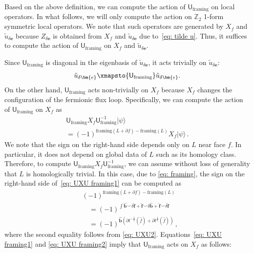 \documentclass[aps,twocolumn,prx,floatfix,preprintnumbers, nofootinbib,10pt]{revtex4-2}
\numberwithin{equation}{section}
\theoremstyle{definition}
\theoremstyle{remark}
\theoremstyle{claim}
\def\ket#1{{|{#1}\rangle}}
\renewcommand{\sf}[1]{\mathsf{#1}}
\begin{document}
Based on the above definition, we can compute the action of $\sf{U}_{\text{framing}}$ on local operators.
In what follows, we will only compute the action on $\mathbb{Z}_2$ 1-form symmetric local operators.
We note that such operators are generated by $X_f$ and $\tilde{u}_{\delta \bm{e}}$ because $Z_{\delta \bm{e}}$ is obtained from $X_f$ and $\tilde{u}_{\delta \bm{e}}$ due to~\eqref{eq: tilde u}.
Thus, it suffices to compute the action of $\sf{U}_{\text{framing}}$ on $X_f$ and $\tilde{u}_{\delta \bm{e}}$.

Since $\sf{U}_{\text{framing}}$ is diagonal in the eigenbasis of $\tilde{u}_{\delta \bm{e}}$, it acts trivially on $\tilde{u}_{\delta \bm{e}}$:
\begin{equation}
\tilde{u}_{\delta \bm{e}} \xmapsto{\sf{U}_{\text{framing}}} \tilde{u}_{\delta \bm{e}}.
\label{eq: U framing u}
\end{equation}
On the other hand, $\sf{U}_{\text{framing}}$ acts non-trivially on $X_f$ because $X_f$ changes the configuration of the fermionic flux loop.
Specifically, we can compute the action of $\sf{U}_{\text{framing}}$ on $X_f$ as
\begin{multline}\label{eq: UXU framing1}
 \sf{U}_{\text{framing}} X_f \sf{U}_{\text{framing}}^{-1} \ket{\psi} \\
= (-1)^{\mathrm{framing}(L+\partial f) - \mathrm{framing}(L)} X_f \ket{\psi} \,.
\end{multline}
We note that the sign on the right-hand side depends only on $L$ near face $f$.
In particular, it does not depend on global data of $L$ such as its homology class.
Therefore, to compute $\sf{U}_{\text{framing}} X_f \sf{U}_{\text{framing}}^{-1}$, we can assume without loss of generality that $L$ is homologically trivial.
In this case, due to \eqref{eq: framing}, the sign on the right-hand side of~\eqref{eq: UXU framing1} can be computed as
\begin{align}\label{eq: UXU framing2}
 &(-1)^{\mathrm{framing}(L+\partial f) - \mathrm{framing}(L)} \nonumber \\
 &\quad =(-1)^{\int \hat{\bm{b}} \smile \delta \hat{\bm{f}} + \hat{\bm{f}} \smile \delta \hat{\bm{b}} + \hat{\bm{f}} \smile \delta \hat{\bm{f}}} \nonumber \\
 &\quad = (-1)^{\hat{\bm{b}}(\partial t^{-\frac{1}{2}}(\hat{f}) + \partial t^{\frac{1}{2}}(\hat{f}))} \,,
\end{align}
where the second equality follows from \eqref{eq: UXU2}.
Equations~\eqref{eq: UXU framing1} and \eqref{eq: UXU framing2} imply that $\sf{U}_{\text{framing}}$ acts on $X_f$ as follows:
\end{document}
